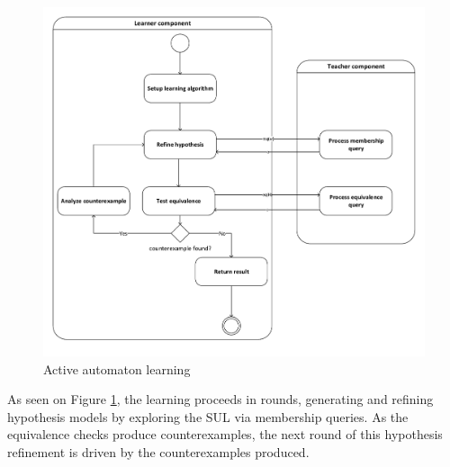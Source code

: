 \begin{figure}[!ht]
	\centering
	\includegraphics[width=1.0\linewidth]{figures/flowchartlearning}
	\caption{Active automaton learning}
	\label{fig:flowchartlearning}
\end{figure}

As seen on Figure \ref{fig:flowchartlearning}, the learning proceeds in rounds, generating and refining hypothesis models by exploring the SUL via membership queries. As the equivalence checks produce counterexamples, the next round of this hypothesis refinement is driven by the counterexamples produced.

